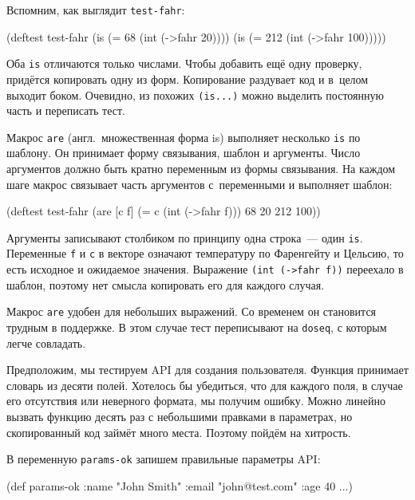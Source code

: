 Вспомним, как выглядит \verb|test-fahr|:

\begin{english}
  \begin{clojure}
(deftest test-fahr
  (is (= 68 (int (->fahr 20))))
  (is (= 212 (int (->fahr 100)))))
  \end{clojure}
\end{english}

Оба \verb|is| отличаются только числами. Чтобы добавить ещё одну проверку,
придётся копировать одну из форм. Копирование раздувает код и в~целом выходит
боком. Очевидно, из похожих \verb|(is...)| можно выделить постоянную часть и
переписать тест.


Макрос \verb|are| (англ.~множественная форма is) выполняет несколько
\verb|is| по шаблону. Он принимает форму связывания, шаблон и аргументы. Число
аргументов должно быть кратно переменным из формы связывания. На каждом шаге
макрос связывает часть аргументов с~переменными и выполняет шаблон:

\begin{english}
  \begin{clojure}
(deftest test-fahr
  (are [c f] (= c (int (->fahr f)))
    68 20
    212 100))
  \end{clojure}
\end{english}

Аргументы записывают столбиком по принципу одна строка~--- один
\verb|is|. Переменные \verb|f| и \verb|c| в векторе означают температуру по
Фаренгейту и Цельсию, то есть исходное и ожидаемое значения. Выражение
\verb|(int (->fahr f))| переехало в шаблон, поэтому нет смысла копировать его
для каждого случая.

Макрос \verb|are| удобен для небольших выражений. Со временем он становится
трудным в поддержке. В этом случае тест переписывают на \verb|doseq|, с которым
легче совладать.

Предположим, мы тестируем API для создания пользователя. Функция принимает
словарь из десяти полей. Хотелось бы убедиться, что для каждого поля, в случае
его отсутствия или неверного формата, мы получим ошибку. Можно линейно вызвать
функцию десять раз с небольшими правками в параметрах, но скопированный код
займёт много места. Поэтому пойдём на хитрость.

В переменную \verb|params-ok| запишем правильные параметры API:

\ifafive

\begin{english}
  \begin{clojure}
(def params-ok
  {:name "John Smith"
   :email "john@test.com"
   :age 40
   ...})
  \end{clojure}
\end{english}

